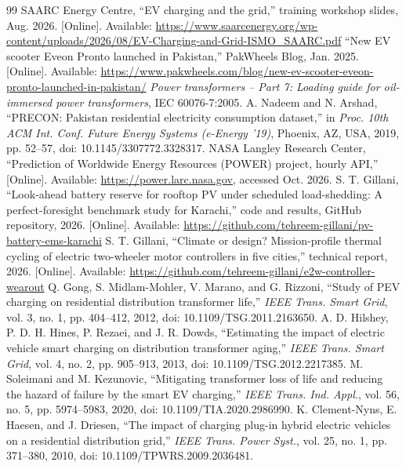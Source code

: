 \documentclass[conference]{IEEEtran}
\begin{document}
\begin{thebibliography}{99}
 SAARC Energy Centre, ``EV charging and the grid,'' training workshop slides, Aug. 2026. [Online]. Available: \url{https://www.saarcenergy.org/wp-content/uploads/2026/08/EV-Charging-and-Grid-ISMO_SAARC.pdf}
 ``New EV scooter Eveon Pronto launched in Pakistan,'' PakWheels Blog, Jan. 2025. [Online]. Available: \url{https://www.pakwheels.com/blog/new-ev-scooter-eveon-pronto-launched-in-pakistan/}
 \emph{Power transformers -- Part 7: Loading guide for oil-immersed power transformers}, IEC 60076-7:2005.
 A. Nadeem and N. Arshad, ``PRECON: Pakistan residential electricity consumption dataset,'' in \emph{Proc. 10th ACM Int. Conf. Future Energy Systems (e-Energy '19)}, Phoenix, AZ, USA, 2019, pp. 52--57, doi: 10.1145/3307772.3328317.
 NASA Langley Research Center, ``Prediction of Worldwide Energy Resources (POWER) project, hourly API,'' [Online]. Available: \url{https://power.larc.nasa.gov}, accessed Oct. 2026.
 S. T. Gillani, ``Look-ahead battery reserve for rooftop PV under scheduled load-shedding: A perfect-foresight benchmark study for Karachi,'' code and results, GitHub repository, 2026. [Online]. Available: \url{https://github.com/tehreem-gillani/pv-battery-ems-karachi}
 S. T. Gillani, ``Climate or design? Mission-profile thermal cycling of electric two-wheeler motor controllers in five cities,'' technical report, 2026. [Online]. Available: \url{https://github.com/tehreem-gillani/e2w-controller-wearout}
 Q. Gong, S. Midlam-Mohler, V. Marano, and G. Rizzoni, ``Study of PEV charging on residential distribution transformer life,'' \emph{IEEE Trans. Smart Grid}, vol. 3, no. 1, pp. 404--412, 2012, doi: 10.1109/TSG.2011.2163650.
 A. D. Hilshey, P. D. H. Hines, P. Rezaei, and J. R. Dowds, ``Estimating the impact of electric vehicle smart charging on distribution transformer aging,'' \emph{IEEE Trans. Smart Grid}, vol. 4, no. 2, pp. 905--913, 2013, doi: 10.1109/TSG.2012.2217385.
 M. Soleimani and M. Kezunovic, ``Mitigating transformer loss of life and reducing the hazard of failure by the smart EV charging,'' \emph{IEEE Trans. Ind. Appl.}, vol. 56, no. 5, pp. 5974--5983, 2020, doi: 10.1109/TIA.2020.2986990.
 K. Clement-Nyns, E. Haesen, and J. Driesen, ``The impact of charging plug-in hybrid electric vehicles on a residential distribution grid,'' \emph{IEEE Trans. Power Syst.}, vol. 25, no. 1, pp. 371--380, 2010, doi: 10.1109/TPWRS.2009.2036481.

\end{thebibliography}
\end{document}
